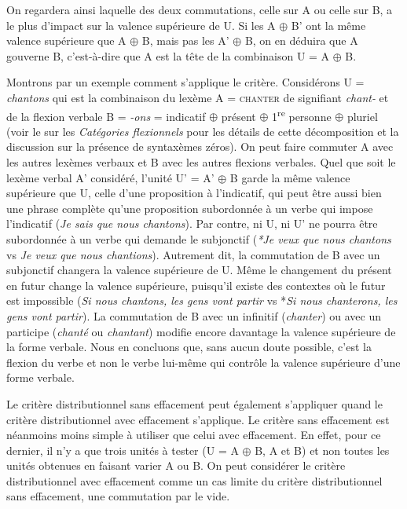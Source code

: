 On regardera ainsi laquelle des deux commutations, celle sur A ou celle sur B, a le plus d’impact sur la valence supérieure de U. Si les A ${\oplus}$ B’ ont la même valence supérieure que A ${\oplus}$ B, mais pas les A’ ${\oplus}$ B, on en déduira que A gouverne B, c’est-à-dire que A est la tête de la combinaison U = A ${\oplus}$ B.

Montrons par un exemple comment s’applique le critère. Considérons U = \textit{chantons} qui est la combinaison du lexème A = \textsc{chanter} de signifiant \textit{chant-} et de la flexion verbale B = \textit{{}-ons} = indicatif ${\oplus}$ présent ${\oplus}$ 1\textsuperscript{re} personne ${\oplus}$ pluriel (voir le  sur les \textit{Catégories flexionnels} pour les détails de cette décomposition et la discussion sur la présence de syntaxèmes zéros). On peut faire commuter A avec les autres lexèmes verbaux et B avec les autres flexions verbales. Quel que soit le lexème verbal A’ considéré, l’unité U’ =  A’ ${\oplus}$ B garde la même valence supérieure que U, celle d’une proposition à l’indicatif, qui peut être aussi bien une phrase complète qu’une proposition subordonnée à un verbe qui impose l’indicatif (\textit{Je sais que nous chantons}). Par contre, ni U, ni U’ ne pourra être subordonnée à un verbe qui demande le subjonctif (\textit{*Je veux que nous chantons} vs \textit{Je veux que nous chantions}). Autrement dit, la commutation de B avec un subjonctif changera la valence supérieure de U. Même le changement du présent en futur change la valence supérieure, puisqu’il existe des contextes où le futur est impossible (\textit{Si nous chantons, les gens vont partir} vs *\textit{Si nous chanterons, les gens vont partir}). La commutation de B avec un infinitif (\textit{chanter}) ou avec un participe (\textit{chanté} ou \textit{chantant}) modifie encore davantage la valence supérieure de la forme verbale. Nous en concluons que, sans aucun doute possible, c’est la flexion du verbe et non le verbe lui-même qui contrôle la valence supérieure d’une forme verbale.

Le critère distributionnel sans effacement peut également s’appliquer quand le critère distributionnel avec effacement s’applique. Le critère sans effacement est néanmoins moins simple à utiliser que celui avec effacement. En effet, pour ce dernier, il n’y a que trois unités à tester (U = A ${\oplus}$ B, A et B) et non toutes les unités obtenues en faisant varier A ou B. On peut considérer le critère distributionnel avec effacement comme un cas limite du critère distributionnel sans effacement, une commutation par le vide.

